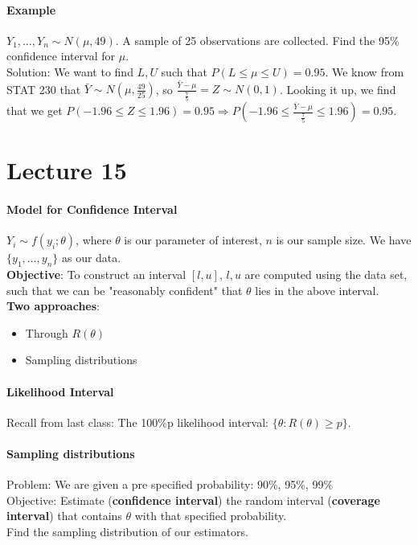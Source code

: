 \documentclass[10pt,letter]{article}
\theoremstyle{plain}
\theoremstyle{definition}
\begin{document}
\paragraph{Example}
$Y_1,\ldots,Y_n\sim N(\mu,49)$. A sample of 25 observations are collected. Find the 95\% confidence interval for $\mu$. \\ 
Solution: We want to find $L,U$ such that $P(L\leq\mu\leq U)=0.95$. We know from STAT 230 that $\bar{Y}\sim N(\mu,\frac{49}{25})$, so $\frac{\bar{Y}-\mu}{\frac{7}{5}}=Z\sim N(0,1)$. Looking it up, we find that we get $P(-1.96\leq Z\leq 1.96)=0.95\Rightarrow P(-1.96\leq \frac{\bar{Y}-\mu}{\frac{7}{5}}\leq1.96)=0.95$. 

\section*{Lecture 15}
\paragraph{Model for Confidence Interval}
$Y_i\sim f(y_i;\theta)$, where $\theta$ is our parameter of interest, $n$ is our sample size. We have $\{y_1,\ldots,y_n\}$ as our data. \\ 
\textbf{Objective}: To construct an interval $[l,u]$, $l,u$ are computed using the data set, such that we can be "reasonably confident" that $\theta$ lies in the above interval. \\ 
\textbf{Two approaches}: 
\begin{itemize}
    \item Through $R(\theta)$
    \item Sampling distributions
\end{itemize}

\paragraph{Likelihood Interval}
Recall from last class: The 100\%p likelihood interval: $\{\theta:R(\theta)\geq p\}$. 

\paragraph{Sampling distributions}
Problem: We are given a pre specified probability: 90\%, 95\%, 99\%\\ 
Objective: Estimate (\textbf{confidence interval}) the random interval (\textbf{coverage interval}) that contains $\theta$  with that specified probability.\\ 
Find the sampling distribution of our estimators. 
\end{document}
